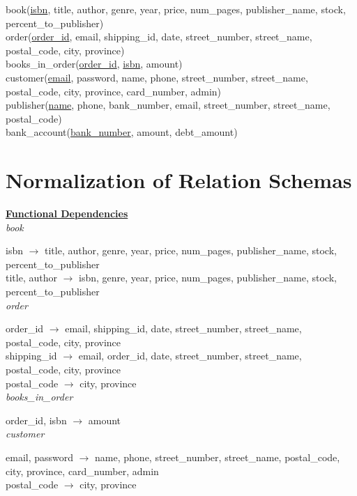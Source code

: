 \documentclass[a4 paper]{article}
\begin{document}
book(\underline{isbn}, title, author, genre, year, price, num\_pages, publisher\_name, stock, percent\_to\_publisher)\\
\indent order(\underline{order\_id}, email, shipping\_id, date, street\_number, street\_name, postal\_code, city, province)\\
\indent books\_in\_order(\underline{order\_id}, \underline{isbn}, amount)\\
\indent customer(\underline{email}, password, name, phone, street\_number, street\_name, postal\_code, city, province, card\_number, admin)\\
\indent publisher(\underline{name}, phone, bank\_number, email, street\_number, street\_name, postal\_code)\\
\indent bank\_account(\underline{bank\_number}, amount, debt\_amount)\\

\section{Normalization of Relation Schemas}

\underline{\textbf{Functional Dependencies}}\\

\noindent\emph{book}

isbn $\rightarrow$ title, author, genre, year, price, num\_pages, publisher\_name, stock, percent\_to\_publisher\\
\indent title, author $\rightarrow$ isbn, genre, year, price, num\_pages, publisher\_name, stock, percent\_to\_publisher\\

\noindent\emph{order}

order\_id $\rightarrow$ email, shipping\_id, date, street\_number, street\_name, postal\_code, city, province\\
\indent shipping\_id $\rightarrow$ email, order\_id, date, street\_number, street\_name, postal\_code, city, province\\
\indent postal\_code $\rightarrow$ city, province\\

\noindent\emph{books\_in\_order}

order\_id, isbn $\rightarrow$ amount\\

\noindent\emph{customer}

email, password $\rightarrow$ name, phone, street\_number, street\_name, postal\_code, city, province, card\_number, admin\\
\indent postal\_code $\rightarrow$ city, province\\
\end{document}
